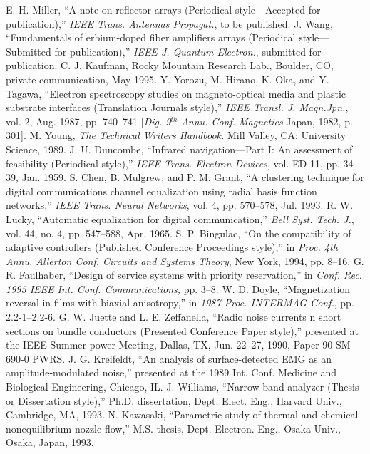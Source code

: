 \documentclass[transmag]{IEEEtran}
\begin{document}
\begin{thebibliography}{00}
 E. H. Miller, ``A note on reflector arrays (Periodical style---Accepted for publication),'' \emph{IEEE Trans. Antennas Propagat.}, to be published.
 J. Wang, ``Fundamentals of erbium-doped fiber amplifiers arrays (Periodical style---Submitted for publication),'' \emph{IEEE J. Quantum Electron.}, submitted for publication.
 C. J. Kaufman, Rocky Mountain Research Lab., Boulder, CO, private communication, May 1995.
 Y. Yorozu, M. Hirano, K. Oka, and Y. Tagawa, ``Electron spectroscopy studies on magneto-optical media and plastic substrate interfaces (Translation Journals style),'' \emph{IEEE Transl. J. Magn.Jpn.}, vol. 2, Aug. 1987, pp. 740--741 [\emph{Dig. 9}$^{th}$\emph{ Annu. Conf. Magnetics} Japan, 1982, p. 301].
 M. Young, \emph{The Technical Writers Handbook.} Mill Valley, CA: University Science, 1989.
 J. U. Duncombe, ``Infrared navigation---Part I: An assessment of feasibility (Periodical style),'' \emph{IEEE Trans. Electron Devices}, vol. ED-11, pp. 34--39, Jan. 1959.
 S. Chen, B. Mulgrew, and P. M. Grant, ``A clustering technique for digital communications channel equalization using radial basis function networks,'' \emph{IEEE Trans. Neural Networks}, vol. 4, pp. 570--578, Jul. 1993.
 R. W. Lucky, ``Automatic equalization for digital communication,'' \emph{Bell Syst. Tech. J.}, vol. 44, no. 4, pp. 547--588, Apr. 1965.
 S. P. Bingulac, ``On the compatibility of adaptive controllers (Published Conference Proceedings style),'' in \emph{Proc. 4th Annu. Allerton Conf. Circuits and Systems Theory}, New York, 1994, pp. 8--16.
 G. R. Faulhaber, ``Design of service systems with priority reservation,'' in \emph{Conf. Rec. 1995 IEEE Int. Conf. Communications,} pp. 3--8.
 W. D. Doyle, ``Magnetization reversal in films with biaxial anisotropy,'' in \emph{1987 Proc. INTERMAG Conf.}, pp. 2.2-1--2.2-6.
 G. W. Juette and L. E. Zeffanella, ``Radio noise currents n short sections on bundle conductors (Presented Conference Paper style),'' presented at the IEEE Summer power Meeting, Dallas, TX, Jun. 22--27, 1990, Paper 90 SM 690-0 PWRS.
 J. G. Kreifeldt, ``An analysis of surface-detected EMG as an amplitude-modulated noise,'' presented at the 1989 Int. Conf. Medicine and Biological Engineering, Chicago, IL.
 J. Williams, ``Narrow-band analyzer (Thesis or Dissertation style),'' Ph.D. dissertation, Dept. Elect. Eng., Harvard Univ., Cambridge, MA, 1993. 
 N. Kawasaki, ``Parametric study of thermal and chemical nonequilibrium nozzle flow,'' M.S. thesis, Dept. Electron. Eng., Osaka Univ., Osaka, Japan, 1993.

\end{thebibliography}
\end{document}

